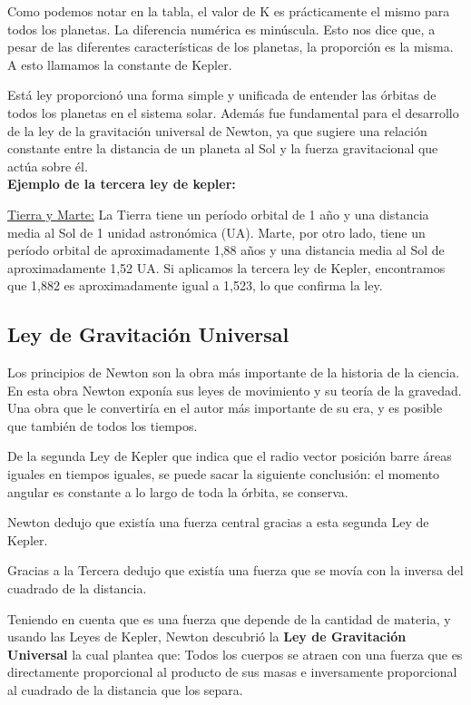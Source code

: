 \documentclass{article}
\begin{document}
	Como podemos notar en la tabla, el valor de K es prácticamente el mismo para todos los planetas. La diferencia numérica es minúscula. Esto nos dice que, a pesar de las diferentes características de los planetas, la proporción es la misma. A esto llamamos la constante de Kepler.
	
	Está ley  proporcionó una forma simple y unificada de entender las órbitas de todos los planetas en el sistema solar. Además fue fundamental para el desarrollo de la ley de la gravitación universal de Newton, ya que sugiere una relación constante entre la distancia de un planeta al Sol y la fuerza gravitacional que actúa sobre él.\\
	
	\textbf{Ejemplo de la tercera ley de kepler:}
	
	\underline{Tierra y Marte:} La Tierra tiene un período orbital de 1 año y una distancia media al Sol de 1 unidad astronómica (UA). Marte, por otro lado, tiene un período orbital de aproximadamente 1,88 años y una distancia media al Sol de aproximadamente 1,52 UA. Si aplicamos la tercera ley de Kepler, encontramos que 1,882 es aproximadamente igual a 1,523, lo que confirma la ley.
	
	
	
	
	
	
	
	
	
	\clearpage
	\subsection{Ley de Gravitación Universal}
	Los principios de Newton son la obra más importante de la historia de la ciencia. En esta obra Newton exponía sus leyes de movimiento y su teoría de la gravedad. Una obra que le convertiría en el autor más importante de su era, y es posible que también de todos los tiempos.
	
	De la segunda Ley de Kepler que indica que el radio vector posición barre áreas iguales en tiempos iguales, se puede sacar la siguiente conclusión: el momento angular es constante a lo largo de toda la órbita, se conserva.
	
	Newton dedujo que existía una fuerza central gracias a esta segunda Ley de Kepler.
	
	Gracias a la Tercera dedujo que existía una fuerza que se movía con la inversa del cuadrado de la distancia.
	
	Teniendo en cuenta que es una fuerza que depende de la cantidad de materia, y usando las Leyes de Kepler, Newton descubrió la \textbf{ Ley de Gravitación Universal} la cual plantea que: Todos los cuerpos se atraen con una fuerza que es directamente proporcional al producto de sus masas e inversamente proporcional al cuadrado de la distancia que los separa. 
	
\end{document}
